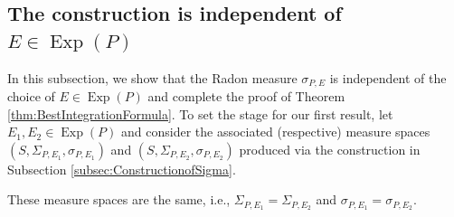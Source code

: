 \documentclass[smallextended]{svjour3}
\theoremstyle{remark}
\newcommand\Exp{\operatorname{Exp}}
\begin{document}
\subsection{The construction is independent of $E\in\Exp(P)$}\label{subsec:IndependentofE}

\noindent In this subsection, we show that the Radon measure $\sigma_{P,E}$ is independent of the choice of $E\in\Exp(P)$ and complete the proof of Theorem \ref{thm:BestIntegrationFormula}. To set the stage for our first result, let $E_1,E_2\in\Exp(P)$ and consider the associated (respective) measure spaces $(S,\Sigma_{P,E_1},\sigma_{P,E_1})$ and $(S,\Sigma_{P,E_2},\sigma_{P,E_2})$ produced via the construction in Subsection \ref{subsec:ConstructionofSigma}. 

\begin{proposition}\label{prop:Endependence}
These measure spaces are the same, i.e., $\Sigma_{P,E_1}=\Sigma_{P,E_2}$ and $\sigma_{P,E_1}=\sigma_{P,E_2}$.
\end{proposition}
\end{document}

